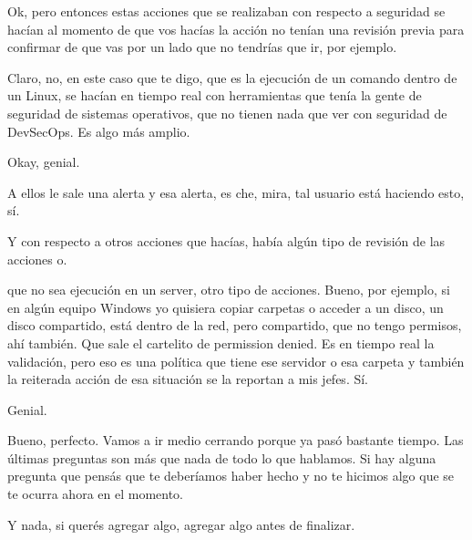 \begin{description}[leftmargin=0cm, labelsep=0.5cm]
    \item[\textbf{MOCIULSKY SANTIAGO:}] Ok, pero entonces estas acciones que se realizaban con respecto a seguridad se hacían al momento de que vos hacías la acción no tenían una revisión previa para confirmar de que vas por un lado que no tendrías que ir, por ejemplo.

    \item[\textbf{VILLARINO PABLO RODOLFO:}] Claro, no, en este caso que te digo, que es la ejecución de un comando dentro de un Linux, se hacían en tiempo real con herramientas que tenía la gente de seguridad de sistemas operativos, que no tienen nada que ver con seguridad de DevSecOps. Es algo más amplio.

    \item[\textbf{MOCIULSKY SANTIAGO:}] Okay, genial.

    \item[\textbf{VILLARINO PABLO RODOLFO:}] A ellos le sale una alerta y esa alerta, es che, mira, tal usuario está haciendo esto, sí.

    \item[\textbf{MOCIULSKY SANTIAGO:}] Y con respecto a otros acciones que hacías, había algún tipo de revisión de las acciones o.

    \item[\textbf{VILLARINO PABLO RODOLFO:}] que no sea ejecución en un server, otro tipo de acciones. Bueno, por ejemplo, si en algún equipo Windows yo quisiera copiar carpetas o acceder a un disco, un disco compartido, está dentro de la red, pero compartido, que no tengo permisos, ahí también. Que sale el cartelito de permission denied. Es en tiempo real la validación, pero eso es una política que tiene ese servidor o esa carpeta y también la reiterada acción de esa situación se la reportan a mis jefes. Sí.

    \item[\textbf{MOCIULSKY SANTIAGO:}] Genial.

    \item[\textbf{MUNTAABSKI FEDERICO:}] Bueno, perfecto. Vamos a ir medio cerrando porque ya pasó bastante tiempo. Las últimas preguntas son más que nada de todo lo que hablamos. Si hay alguna pregunta que pensás que te deberíamos haber hecho y no te hicimos algo que se te ocurra ahora en el momento.

    \item[\textbf{MUNTAABSKI FEDERICO:}] Y nada, si querés agregar algo, agregar algo antes de finalizar.


\end{description}
